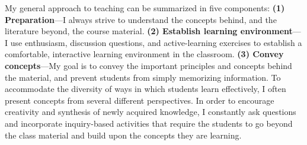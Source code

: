My general approach to teaching can be summarized in five components:
\textbf{(1) Preparation}---I always strive to understand the concepts behind,
and the literature beyond, the course material.
\textbf{(2) Establish learning environment}---I use enthusiasm, discussion
questions, and active-learning exercises to establish a comfortable,
interactive learning environment in the classroom.
\textbf{(3) Convey concepts}---My goal is to convey the important principles
and concepts behind the material, and prevent students from simply memorizing
information.
To accommodate the diversity of ways in which students learn effectively, I
often present concepts from several different perspectives.
In order to encourage creativity and synthesis of newly acquired knowledge,
I constantly ask questions and incorporate inquiry-based activities that
require the students to go beyond the class material and build upon the
concepts they are learning.
